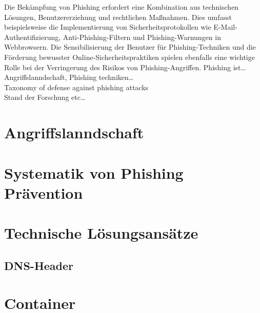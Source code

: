 \documentclass[journal=tosc,final]{iacrtrans}
\begin{document}
Die Bekämpfung von Phishing erfordert eine Kombination aus technischen Lösungen, Benutzererziehung und rechtlichen Maßnahmen. Dies umfasst beispielsweise die Implementierung von Sicherheitsprotokollen wie E-Mail-Authentifizierung, Anti-Phishing-Filtern und Phishing-Warnungen in Webbrowsern. Die Sensibilisierung der Benutzer für Phishing-Techniken und die Förderung bewusster Online-Sicherheitspraktiken spielen ebenfalls eine wichtige Rolle bei der Verringerung des Risikos von Phishing-Angriffen. 
Phishing ist\dots\\
Angriffslanndschaft, Phishing techniken\dots\\
Taxonomy of defense against phishing attacks\\
Stand der Forschung etc\dots

\newpage
\section{Angriffslanndschaft}
\section{Systematik von Phishing Prävention}
\section{Technische Lösungsansätze}
\subsection{DNS-Header}
\section{Container}


\end{document}
